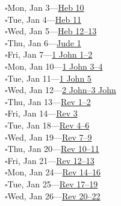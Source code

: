 \hypertarget{rp-2028-01-03}{}\noindent$\square$\enspace Mon, Jan 3\enspace---\enspace \hyperlink{ch-hebrews-10}{Heb 10}\\
\hypertarget{rp-2028-01-04}{}\noindent$\square$\enspace Tue, Jan 4\enspace---\enspace \hyperlink{ch-hebrews-11}{Heb 11}\\
\hypertarget{rp-2028-01-05}{}\noindent$\square$\enspace Wed, Jan 5\enspace---\enspace \hyperlink{ch-hebrews-12}{Heb 12--13}\\
\hypertarget{rp-2028-01-06}{}\noindent$\square$\enspace Thu, Jan 6\enspace---\enspace \hyperlink{ch-jude-1}{Jude 1}\\
\hypertarget{rp-2028-01-07}{}\noindent$\square$\enspace Fri, Jan 7\enspace---\enspace \hyperlink{ch-1john-1}{1 John 1--2}\\
\hypertarget{rp-2028-01-10}{}\noindent$\square$\enspace Mon, Jan 10\enspace---\enspace \hyperlink{ch-1john-3}{1 John 3--4}\\
\hypertarget{rp-2028-01-11}{}\noindent$\square$\enspace Tue, Jan 11\enspace---\enspace \hyperlink{ch-1john-5}{1 John 5}\\
\hypertarget{rp-2028-01-12}{}\noindent$\square$\enspace Wed, Jan 12\enspace---\enspace \hyperlink{ch-2john-1}{2 John--3 John}\\
\hypertarget{rp-2028-01-13}{}\noindent$\square$\enspace Thu, Jan 13\enspace---\enspace \hyperlink{ch-revelation-1}{Rev 1--2}\\
\hypertarget{rp-2028-01-14}{}\noindent$\square$\enspace Fri, Jan 14\enspace---\enspace \hyperlink{ch-revelation-3}{Rev 3}\\
\hypertarget{rp-2028-01-18}{}\noindent$\square$\enspace Tue, Jan 18\enspace---\enspace \hyperlink{ch-revelation-4}{Rev 4--6}\\
\hypertarget{rp-2028-01-19}{}\noindent$\square$\enspace Wed, Jan 19\enspace---\enspace \hyperlink{ch-revelation-7}{Rev 7--9}\\
\hypertarget{rp-2028-01-20}{}\noindent$\square$\enspace Thu, Jan 20\enspace---\enspace \hyperlink{ch-revelation-10}{Rev 10--11}\\
\hypertarget{rp-2028-01-21}{}\noindent$\square$\enspace Fri, Jan 21\enspace---\enspace \hyperlink{ch-revelation-12}{Rev 12--13}\\
\hypertarget{rp-2028-01-24}{}\noindent$\square$\enspace Mon, Jan 24\enspace---\enspace \hyperlink{ch-revelation-14}{Rev 14--16}\\
\hypertarget{rp-2028-01-25}{}\noindent$\square$\enspace Tue, Jan 25\enspace---\enspace \hyperlink{ch-revelation-17}{Rev 17--19}\\
\hypertarget{rp-2028-01-26}{}\noindent$\square$\enspace Wed, Jan 26\enspace---\enspace \hyperlink{ch-revelation-20}{Rev 20--22}\\

